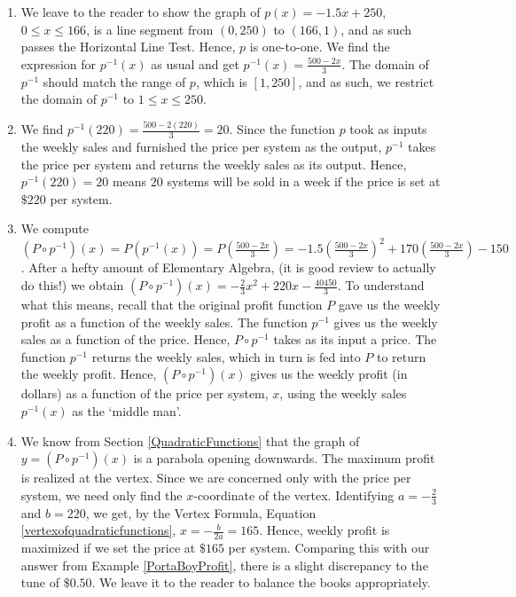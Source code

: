 {
\begin{enumerate}

\item  We leave to the reader to show the graph of $p(x) = -1.5x + 250$, $0 \leq x \leq 166$, is a line segment from $(0,250)$ to $(166,1)$, and as such passes the Horizontal Line Test.  Hence, $p$ is one-to-one.  We find the expression for $p^{-1}(x)$ as usual and get $p^{-1}(x) =  \frac{500-2x}{3}$.  The domain of $p^{-1}$ should match the range of $p$, which is $[1,250]$, and as such, we restrict the domain of $p^{-1}$ to $1 \leq x \leq 250$.  

\item  We find $p^{-1}(220) = \frac{500-2(220)}{3} = 20$.  Since the function $p$ took as inputs the weekly sales  and furnished the price per system as the output, $p^{-1}$ takes the price per system and returns the weekly sales as its output.  Hence, $p^{-1}(220) = 20$ means $20$ systems will be sold in a week if the price is set at $\$ 220$ per system.

\item  We compute $\left( P \circ p^{-1}\right)(x) = P \left(p^{-1}(x)\right) = P\left(\frac{500-2x}{3}\right) =  -1.5\left(\frac{500-2x}{3}\right)^2+170\left(\frac{500-2x}{3}\right)-150$. After a hefty amount of Elementary Algebra, (it is good review to actually do this!) we obtain $\left( P \circ p^{-1}\right)(x) = -\frac{2}{3} x^2 +220x - \frac{40450}{3}$.  To understand what this means, recall that the original profit function $P$ gave us the weekly profit as a function of the weekly sales.  The function $p^{-1}$ gives us the weekly sales as a function of the price.  Hence, $P \circ p^{-1}$ takes as its input a price.   The function $p^{-1}$ returns the weekly sales, which in turn is fed into $P$ to return the weekly profit.  Hence, $\left(P \circ p^{-1}\right)(x)$ gives us the weekly profit (in dollars) as a function of the price per system, $x$, using the weekly sales $p^{-1}(x)$ as the `middle man'. 

\item  We know from Section \ref{QuadraticFunctions} that the graph of $y = \left( P \circ p^{-1}\right)(x)$ is a parabola opening downwards.  The maximum profit is realized at the vertex. Since we are concerned only with the price per system, we need only find the $x$-coordinate of the vertex.  Identifying $a = -\frac{2}{3}$ and $b = 220$, we get, by the Vertex Formula, Equation \ref{vertexofquadraticfunctions},  $x = -\frac{b}{2a} = 165$.  Hence, weekly profit is maximized if we set the price at $\$165$ per system.  Comparing this with our answer from Example \ref{PortaBoyProfit}, there is a slight discrepancy to the tune of $\$0.50$.  We leave it to the reader to balance the books appropriately.  

\end{enumerate}
}

